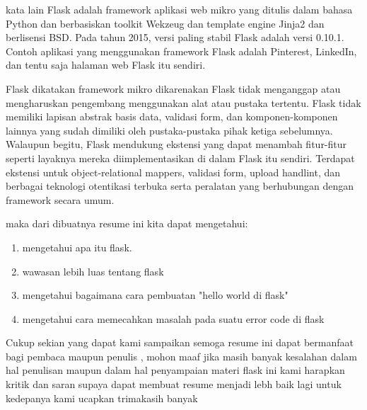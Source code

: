\documentclass[12pt]{article}
\begin{document}
kata lain Flask adalah framework aplikasi web mikro yang ditulis dalam bahasa Python dan berbasiskan toolkit Wekzeug dan template engine Jinja2 dan berlisensi BSD. Pada tahun 2015, versi paling stabil Flask adalah versi 0.10.1. Contoh aplikasi yang menggunakan framework Flask adalah Pinterest, LinkedIn, dan tentu saja halaman web Flask itu sendiri.

Flask dikatakan framework mikro dikarenakan Flask tidak menganggap atau mengharuskan pengembang menggunakan alat atau pustaka tertentu. Flask tidak memiliki lapisan abstrak basis data, validasi form, dan komponen-komponen lainnya yang sudah dimiliki oleh pustaka-pustaka pihak ketiga sebelumnya. Walaupun begitu, Flask mendukung ekstensi yang dapat menambah fitur-fitur seperti layaknya mereka diimplementasikan di dalam Flask itu sendiri. Terdapat ekstensi untuk object-relational mappers, validasi form, upload handlint, dan berbagai teknologi otentikasi terbuka serta peralatan yang berhubungan dengan framework secara umum\cite{solihin2016implementasi}. 

maka dari dibuatnya resume ini kita dapat mengetahui: 
	
\begin{enumerate}
\item mengetahui apa itu flask.
\item wawasan lebih luas tentang flask
\item mengetahui bagaimana cara pembuatan "hello world di flask"
\item mengetahui cara memecahkan masalah pada suatu error code di flask
\end{enumerate}	


Cukup sekian yang dapat kami sampaikan semoga resume ini dapat bermanfaat bagi pembaca maupun penulis , mohon maaf jika masih banyak kesalahan dalam hal penulisan maupun dalam hal penyampaian materi flask ini kami harapkan kritik dan saran supaya dapat membuat resume menjadi lebh baik lagi untuk kedepanya kami ucapkan trimakasih banyak  
\end{document}
